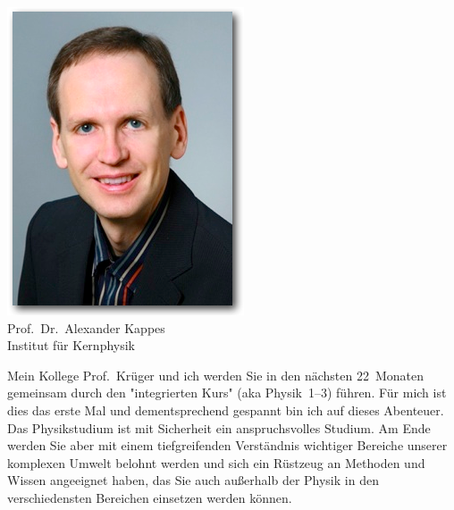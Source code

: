 \begin{multicols}{2}
\begin{center}
	\includegraphics[width=\columnwidth, height=0.35\textheight]{res/vorstellungsfotos/alexander_kappes.png}\\
	Prof.\ Dr.\ Alexander Kappes\\
	Institut für Kernphysik
\end{center}

Mein Kollege Prof.\ Krüger und ich werden Sie in den nächsten 22~Monaten gemeinsam durch den "integrierten Kurs" (aka Physik~1--3) führen.
Für mich ist dies das erste Mal und dementsprechend gespannt bin ich auf dieses Abenteuer.
Das Physikstudium ist mit Sicherheit ein anspruchsvolles Studium.
Am Ende werden Sie aber mit einem tiefgreifenden Verständnis wichtiger Bereiche unserer komplexen Umwelt belohnt werden und sich ein Rüstzeug an Methoden und Wissen angeeignet haben, das Sie auch außerhalb der Physik in den verschiedensten Bereichen einsetzen werden können.


\end{multicols}
